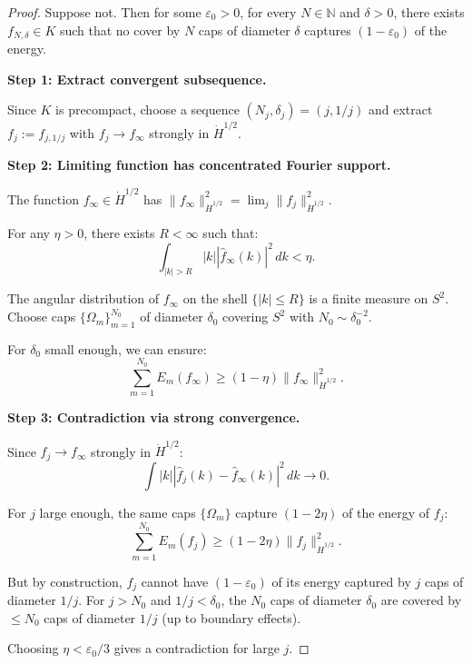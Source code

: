 \documentclass[11pt]{article}
\theoremstyle{definition}
\newcommand{\N}{\mathbb{N}}
\begin{document}
\begin{proof}
Suppose not. Then for some $\varepsilon_0 > 0$, for every $N \in \N$ and $\delta > 0$, there exists $f_{N,\delta} \in K$ such that no cover by $N$ caps of diameter $\delta$ captures $(1-\varepsilon_0)$ of the energy.

\textbf{Step 1: Extract convergent subsequence.}

Since $K$ is precompact, choose a sequence $(N_j, \delta_j) = (j, 1/j)$ and extract $f_j := f_{j, 1/j}$ with $f_j \to f_\infty$ strongly in $\dot{H}^{1/2}$.

\textbf{Step 2: Limiting function has concentrated Fourier support.}

The function $f_\infty \in \dot{H}^{1/2}$ has $\|f_\infty\|_{\dot{H}^{1/2}}^2 = \lim_j \|f_j\|_{\dot{H}^{1/2}}^2$. 

For any $\eta > 0$, there exists $R < \infty$ such that:
\begin{equation}
\int_{|k| > R} |k| |\hat{f}_\infty(k)|^2 \, dk < \eta.
\end{equation}

The angular distribution of $f_\infty$ on the shell $\{|k| \leq R\}$ is a finite measure on $S^2$. Choose caps $\{\Omega_m\}_{m=1}^{N_0}$ of diameter $\delta_0$ covering $S^2$ with $N_0 \sim \delta_0^{-2}$.

For $\delta_0$ small enough, we can ensure:
\begin{equation}
\sum_{m=1}^{N_0} E_m(f_\infty) \geq (1 - \eta) \|f_\infty\|_{\dot{H}^{1/2}}^2.
\end{equation}

\textbf{Step 3: Contradiction via strong convergence.}

Since $f_j \to f_\infty$ strongly in $\dot{H}^{1/2}$:
\begin{equation}
\int |k| |\hat{f}_j(k) - \hat{f}_\infty(k)|^2 \, dk \to 0.
\end{equation}

For $j$ large enough, the same caps $\{\Omega_m\}$ capture $(1 - 2\eta)$ of the energy of $f_j$:
\begin{equation}
\sum_{m=1}^{N_0} E_m(f_j) \geq (1 - 2\eta) \|f_j\|_{\dot{H}^{1/2}}^2.
\end{equation}

But by construction, $f_j$ cannot have $(1-\varepsilon_0)$ of its energy captured by $j$ caps of diameter $1/j$. For $j > N_0$ and $1/j < \delta_0$, the $N_0$ caps of diameter $\delta_0$ are covered by $\leq N_0$ caps of diameter $1/j$ (up to boundary effects).

Choosing $\eta < \varepsilon_0/3$ gives a contradiction for large $j$.
\end{proof}
\end{document}
